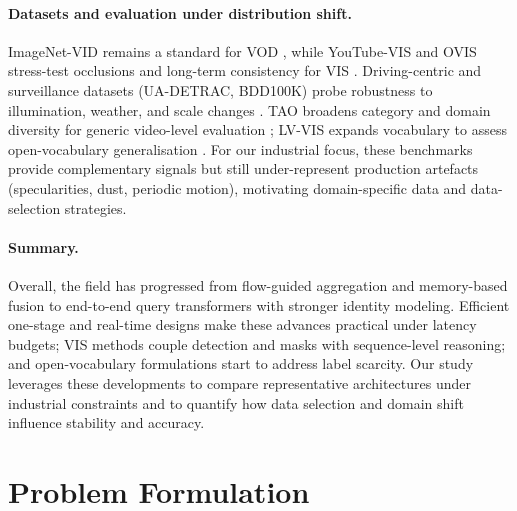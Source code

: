 \documentclass{article}
\begin{document}
\paragraph{Datasets and evaluation under distribution shift.}
ImageNet-VID remains a standard for VOD \citep{ImageNetVID2015}, while YouTube-VIS and OVIS stress-test occlusions and long-term consistency for VIS \citep{YouTubeVIS2019,OVIS2022}. Driving-centric and surveillance datasets (UA-DETRAC, BDD100K) probe robustness to illumination, weather, and scale changes \citep{UADETRAC2015,BDD100K2020}. TAO broadens category and domain diversity for generic video-level evaluation \citep{TAO2020}; LV-VIS expands vocabulary to assess open-vocabulary generalisation \citep{LVVIS2024}. For our industrial focus, these benchmarks provide complementary signals but still under-represent production artefacts (specularities, dust, periodic motion), motivating domain-specific data and data-selection strategies.

\paragraph{Summary.}
Overall, the field has progressed from flow-guided aggregation and memory-based fusion to end-to-end query transformers with stronger identity modeling. Efficient one-stage and real-time designs make these advances practical under latency budgets; VIS methods couple detection and masks with sequence-level reasoning; and open-vocabulary formulations start to address label scarcity. Our study leverages these developments to compare representative architectures under industrial constraints and to quantify how data selection and domain shift influence stability and accuracy.



\section{Problem Formulation}
\end{document}
